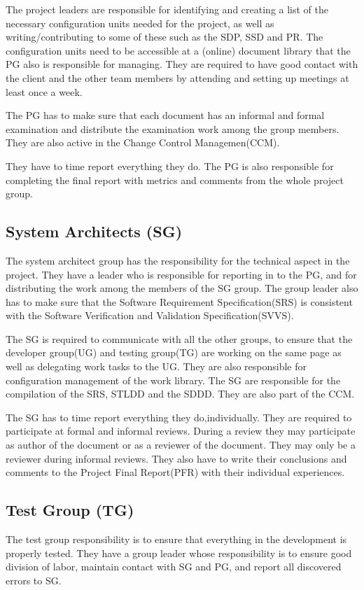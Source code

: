 \documentclass{article}
\begin{document}
The project leaders are responsible for identifying and creating a list of the necessary configuration units needed for the project, as well as writing/contributing to some of these such as the SDP, SSD and PR. The configuration units need to be accessible at a (online) document library that the PG also is responsible for managing. They are required to have good contact with the client and the other team members by attending and setting up meetings at least once a week.

The PG has to make sure that each document has an informal and formal examination and distribute the examination work among the group members. They are also active in the Change Control Managemen(CCM).

They have to time report everything they do. The PG is also responsible for completing the final report with metrics and comments from the whole project group. 
\subsection{System Architects (SG)}
The system architect group has the responsibility for the technical aspect in the project. They have a leader who is responsible for reporting in to the PG, and for distributing the work among the members of the SG group. The group leader also has to make sure that the Software Requirement Specification(SRS) is consistent with the Software Verification and Validation Specification(SVVS).

The SG is required to communicate with all the other groups, to ensure that the developer group(UG) and testing group(TG) are working on the same page as well as delegating work tasks to the UG. They are also responsible for configuration management of the work library. The SG are responsible for the compilation of the SRS, STLDD and the SDDD. They are also part of the CCM. 

The SG has to time report everything they do,individually. They are required to participate at formal and informal reviews. During a review they may participate as author of the document or as a reviewer of the document. They may only be a reviewer during informal reviews. They also have to write their conclusions and comments to the Project Final Report(PFR) with their individual experiences.
\subsection{Test Group (TG)}
The test group responsibility is to ensure that everything in the development is properly tested. They have a group leader whose responsibility is to ensure good division of labor, maintain contact with SG and PG, and report all discovered errors to SG.
\end{document}

